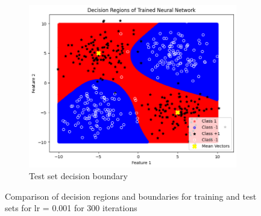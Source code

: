 \documentclass[a4paper,12pt]{article}
\begin{document}
\begin{figure}[H]
    \begin{subfigure}{0.45\textwidth}
        \centering
        \includegraphics[width=\textwidth]{3.3_.001_300_Test.png}
        \caption{Test set decision boundary}
    \end{subfigure}

    \caption{Comparison of decision regions and boundaries for training and test sets for lr = 0.001 for 300 iterations}
\end{figure}
\end{document}
